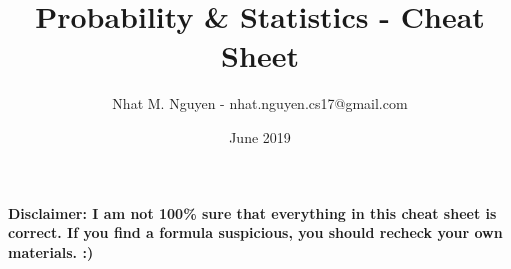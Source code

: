 \documentclass[9pt, landscape, a4paper]{article}
\title{\vspace{-4ex}\Large{Probability \& Statistics - Cheat Sheet}}
\author{Nhat M. Nguyen - nhat.nguyen.cs17@gmail.com}
\date{June 2019}
\newcommand{\tb}[1]{\textbf{#1}}
\begin{document}
  \maketitle

  \par \tb{Disclaimer: I am not 100\% sure that everything in this cheat sheet is correct. If you find a formula suspicious, you should recheck your own materials. :) }
  \begin{multicols}{2}
    \tableofcontents
  \end{multicols}

  \clearpage

  
  
  
  
  
  
  
  
\end{document}
